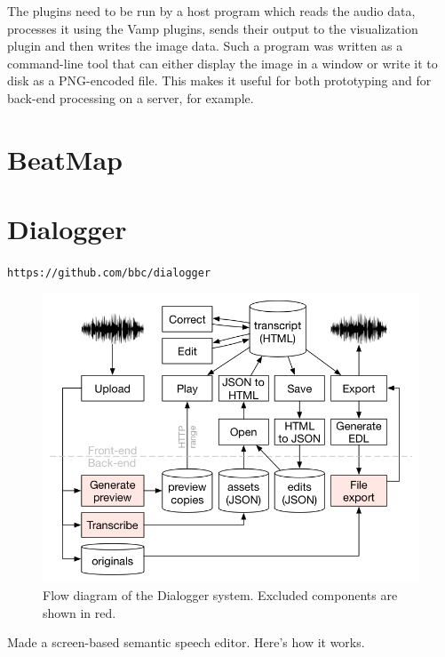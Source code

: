 The plugins need to be run by a host program which reads the audio data, processes it using the Vamp plugins, sends
their output to the visualization plugin and then writes the image data. Such a program was written as a command-line
tool that can either display the image in a window or write it to disk as a PNG-encoded file. This makes it useful for
both prototyping and for back-end processing on a server, for example.

\clearpage
\section{BeatMap}\label{sec:beatmap}

\clearpage
\section{Dialogger}\label{sec:dialogger}

\texttt{https://github.com/bbc/dialogger}

\begin{figure}
\centering
  \includegraphics[width=\columnwidth]{figs/dialogger-flow-diagram.png}
  \caption{Flow diagram of the Dialogger system. Excluded components are shown in red.}
  \label{fig:dialogger-flow}
\end{figure}

Made a screen-based semantic speech editor. Here's how it works.
